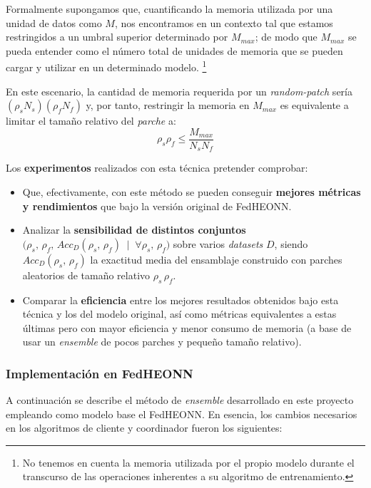 \documentclass[00-Trabajo_Final.tex]{subfiles}
\begin{document}
\vspace{0.5em}

Formalmente supongamos que, cuantificando la memoria utilizada por una unidad de datos como $M$, nos encontramos en un contexto tal que estamos restringidos a un umbral superior determinado por $M_{max}$; de modo que $M_{max}$ se pueda entender como el número total de unidades de memoria que se pueden cargar y utilizar en un determinado modelo. \footnote{No tenemos en cuenta la memoria utilizada por el propio modelo durante el transcurso de las operaciones inherentes a su algoritmo de entrenamiento.}

\vspace{0.5em}

En este escenario, la cantidad de memoria requerida por un \textit{random-patch} sería $(\rho_s N_s)(\rho_f N_f)$ y, por tanto, restringir la memoria en $M_{max}$ es equivalente a limitar el tamaño relativo del \textit{parche} a: 
\[
    \rho_s \rho_f \le \frac{M_{max}}{N_s N_f}
\]

\vspace{0.5em}
\noindent Los \textbf{experimentos} realizados con esta técnica pretender comprobar:
\begin{itemize}[noitemsep]
    \item Que, efectivamente, con este método se pueden conseguir \textbf{mejores métricas y rendimientos} que bajo la versión original de FedHEONN.
    \item Analizar la \textbf{sensibilidad de distintos conjuntos} ${\bigl(\rho_s,\,\rho_f,\,Acc_{D}(\rho_s,\,\rho_f)\;\mid\;\forall \rho_s,\,\rho_f \bigr)}$ sobre varios \textit{datasets} $D$, siendo $Acc_{D}(\rho_s,\,\rho_f)$ la exactitud media del ensamblaje construido con parches aleatorios de tamaño relativo $\rho_s\,\rho_f$.
    \item Comparar la \textbf{eficiencia} entre los mejores resultados obtenidos bajo esta técnica y los del modelo original, así como métricas equivalentes a estas últimas pero con mayor eficiencia y menor consumo de memoria (a base de usar un \textit{ensemble} de pocos parches y pequeño tamaño relativo).
\end{itemize}

\subsubsection*{Implementación en FedHEONN}

A continuación se describe el método de \textit{ensemble} desarrollado en este proyecto empleando como modelo base el FedHEONN. En esencia, los cambios necesarios en los algoritmos de cliente y coordinador fueron los siguientes:
\end{document}
